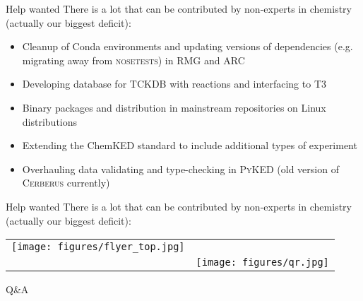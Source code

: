 \begin{frame}{Help wanted}
There is a lot that can be contributed by non-experts in chemistry (actually our biggest deficit):

\begin{itemize}
 \item Cleanup of Conda environments and updating versions of dependencies (e.g. migrating away from \textsc{nosetests}) in \textsc{RMG} and \textsc{ARC}
 \item Developing database for \textsc{TCKDB} with reactions and interfacing to \textsc{T3}
 \item Binary packages and distribution in mainstream repositories on Linux distributions
 \item Extending the ChemKED standard to include additional types of experiment
 \item Overhauling data validating and type-checking in \textsc{PyKED} (old version of \textsc{Cerberus} currently)
\end{itemize}

\end{frame}


\begin{frame}{Help wanted}
There is a lot that can be contributed by non-experts in chemistry (actually our biggest deficit):
\vspace{5mm}
\begin{tabular}{cc}
	\texttt{[image: figures/flyer\_top.jpg]} & \\
	& \texttt{[image: figures/qr.jpg]}
\end{tabular}


\end{frame}

\begin{frame}{Q\&A}
 
\end{frame}
